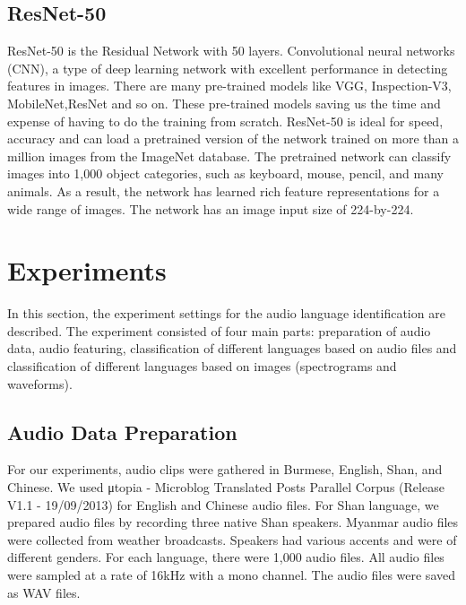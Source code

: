 \documentclass[conference]{IEEEtran}
\begin{document}
\subsection{ResNet-50}\label{SubSec:ResNet}
ResNet-50 is the Residual Network with 50 layers. Convolutional neural networks (CNN), a type of deep learning network with excellent performance in detecting features in images\cite{b15}. There are many pre-trained models like VGG, Inspection-V3, MobileNet,ResNet and so on. These pre-trained models saving us the time and expense of having to do the training from scratch. ResNet-50 is ideal for speed, accuracy and can load a pretrained version of the network trained on more than a million images from the ImageNet database. The pretrained network can classify images into 1,000 object categories, such as keyboard, mouse, pencil, and many animals. As a result, the network has learned rich feature representations for a wide range of images. The network has an image input size of 224-by-224\cite{b16}.

\section{Experiments}\label{Sec:Experiments}
In this section, the experiment settings for the audio language identification are described. The experiment consisted of four main parts: preparation of audio data, audio featuring, classification of different languages based on audio files and classification of different languages based on images (spectrograms and waveforms).

\subsection{Audio Data Preparation}\label{SubSec:AudioCorpus}
For our experiments, audio clips were gathered in Burmese, English, Shan, and Chinese. We used μtopia - Microblog Translated Posts Parallel Corpus (Release V1.1 - 19/09/2013) for English and Chinese audio files. For Shan language, we prepared audio files by recording three native Shan speakers. Myanmar audio files were collected from weather broadcasts. Speakers had various accents and were of different genders. For each language, there were 1,000 audio files. All audio files were sampled at a rate of 16kHz with a mono channel. The audio files were saved as WAV files.   
\end{document}
